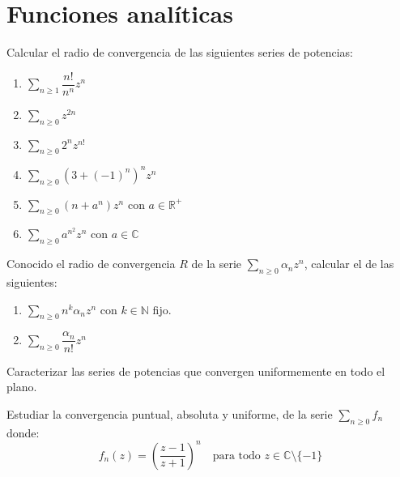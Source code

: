 \section{Funciones analíticas}

\begin{ejercicio}
    Calcular el radio de convergencia de las siguientes series de potencias:
    \begin{enumerate}
        \item $\displaystyle \sum_{n \geq 1} \dfrac{n!}{n^n}z^n$
        \item $\displaystyle \sum_{n \geq 0} z^{2n}$
        \item $\displaystyle \sum_{n \geq 0} 2^nz^{n!}$
        \item $\displaystyle \sum_{n \geq 0} \left(3+(-1)^n\right)^n z^n$
        \item $\displaystyle \sum_{n \geq 0} \left(n+a^n\right)z^n$ con $a \in \mathbb{R}^+$
        \item $\displaystyle \sum_{n \geq 0} a^{n^2}z^n$ con $a \in \mathbb{C}$
    \end{enumerate}
\end{ejercicio}

\begin{ejercicio}
    Conocido el radio de convergencia $R$ de la serie $\displaystyle \sum_{n \geq 0} \alpha_nz^n$, calcular el de las siguientes:
    \begin{enumerate}
        \item $\displaystyle \sum_{n \geq 0} n^k\alpha_nz^n$ con $k \in \mathbb{N}$ fijo.
        \item $\displaystyle \sum_{n \geq 0} \dfrac{\alpha_n}{n!}z^n$
    \end{enumerate}
\end{ejercicio}

\begin{ejercicio}
    Caracterizar las series de potencias que convergen uniformemente en todo el plano.
\end{ejercicio}

\begin{ejercicio}
    Estudiar la convergencia puntual, absoluta y uniforme, de la serie $\displaystyle \sum_{n \geq 0} f_n$ donde:
    \[
        f_n(z) = \left(\dfrac{z-1}{z+1}\right)^n \quad \text{para todo } z \in \mathbb{C}\setminus\{-1\}
    \]
\end{ejercicio}